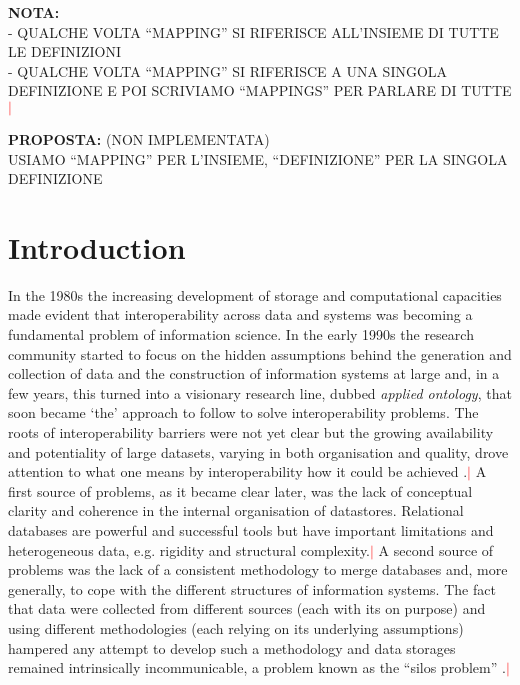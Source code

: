 \documentclass[ao]{iosart2x}
\newcommand{\nb}[1]{\textcolor{red}{$|$}\marginpar{\hspace*{-0cm}\parbox{20mm}{\scriptsize\raggedright\textcolor{red}{#1}}}}
\begin{document}
\noindent
{\bf NOTA:}\\
- QUALCHE VOLTA ``MAPPING'' SI RIFERISCE ALL'INSIEME DI TUTTE LE DEFINIZIONI\\
- QUALCHE VOLTA ``MAPPING'' SI RIFERISCE A UNA SINGOLA DEFINIZIONE E POI SCRIVIAMO ``MAPPINGS'' PER PARLARE DI TUTTE\nb{CM: non ci vedo un problema forte, comunque mi sembra che siamo già abbastanza su questa linea}

\medskip
\noindent
{\bf PROPOSTA:} (NON IMPLEMENTATA)\\ 
USIAMO ``MAPPING'' PER L'INSIEME, ``DEFINIZIONE'' PER LA SINGOLA DEFINIZIONE\\



\section{Introduction}\label{sect_intro}



In the 1980s the increasing development of storage and computational capacities made evident that interoperability across data and systems was becoming a fundamental problem of information science. In the early 1990s the research community started to focus on the hidden assumptions behind the generation and collection of data and the construction of information systems at large and, in a few years, this turned into a visionary research line, dubbed {\em applied ontology}, that soon became `the' approach to follow to solve interoperability problems. 
The roots of interoperability barriers were not yet clear but the growing availability and potentiality of large datasets, varying in both organisation and quality, drove attention to what one means by interoperability how it could be achieved \citep{?}.\nb{CM: @Stefano, aggiungere entry} 
A first source of problems, as it became clear later, was the lack of conceptual clarity and coherence in the internal organisation of datastores. Relational databases are powerful and successful tools but have important limitations and heterogeneous data, e.g. rigidity and structural complexity.\nb{CM: non capisco questa frase, in che senso hanno heterogeneous data?} 
A second source of problems was the lack of a consistent methodology to merge databases and, more generally, to cope with the different structures of information systems. The fact that data were collected from different sources (each with its on purpose) and using different methodologies (each relying on its underlying assumptions) hampered any attempt to develop such a methodology and data storages remained intrinsically incommunicable, a problem known as the ``silos problem'' \citep{?}.\nb{CM: @Stefano, aggiungere entry} 
\end{document}
